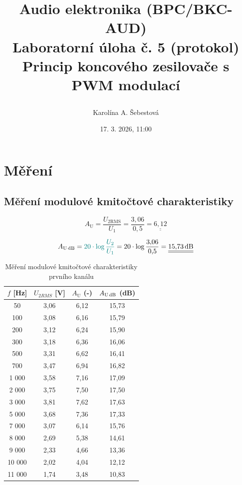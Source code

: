 \documentclass[a4paper, czech]{article}
\title{
	\begin{framed}
		\setstretch{1.5}
		{\large Audio elektronika (BPC/BKC-AUD)}\\
		Laboratorní úloha č. 5 (protokol)\\
		\textbf{Princip koncového zesilovače s PWM modulací}
	\end{framed}
	}
\author{Karolína A. Šebestová}
\date{17. 3. 2026, 11:00}
\begin{document}
\maketitle

\section{Měření}

\subsection{Měření modulové kmitočtové charakteristiky}

\begin{equation}
	A_\text{U} = \frac{U_{2\text{RMS}}}{U_1} = \frac{3{,}06}{0{,}5} = \underline{\underline{6{,}12}}
\end{equation}

\begin{equation}
	A_\text{U\,dB} = \textcolor{teal}{20 \cdot \log \frac{U_\text{2}}{U_1}} = 20 \cdot \log \frac{3{,}06}{0{,}5} = \underline{\underline{15{,}73\,\text{dB}}}
\end{equation}

\begin{table}[H]
	\centering
	\caption{Měření modulové kmitočtové charakteristiky prvního kanálu}
	\begin{tabular}{cccc}
		\toprule
		$f$ \textbf{[Hz]} & $U_{2RMS}$ \textbf{[V]} & $A_\text{U}$ \textbf{(-)} & $A_\text{U\,dB}$ \textbf{(dB)}   \\
		\midrule
		50     & 3,06 & 6,12 & 15,73 \\
		100    & 3,08 & 6,16 & 15,79 \\
		200    & 3,12 & 6,24 & 15,90 \\
		300    & 3,18 & 6,36 & 16,06 \\
		500    & 3,31 & 6,62 & 16,41 \\
		700    & 3,47 & 6,94 & 16,82 \\
		1 000  & 3,58 & 7,16 & 17,09 \\
		2 000  & 3,75 & 7,50 & 17,50 \\
		3 000  & 3,81 & 7,62 & 17,63 \\
		5 000  & 3,68 & 7,36 & 17,33 \\
		7 000  & 3,07 & 6,14 & 15,76 \\
		8 000  & 2,69 & 5,38 & 14,61 \\
		9 000  & 2,33 & 4,66 & 13,36 \\
		10 000 & 2,02 & 4,04 & 12,12 \\
		11 000 & 1,74 & 3,48 & 10,83 \\
		\bottomrule
	\end{tabular}
\end{table}
\end{document}
